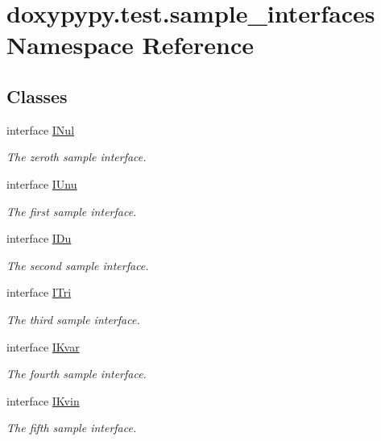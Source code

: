 \hypertarget{namespacedoxypypy_1_1test_1_1sample__interfaces}{\section{doxypypy.\-test.\-sample\-\_\-interfaces Namespace Reference}
\label{namespacedoxypypy_1_1test_1_1sample__interfaces}
}
\subsection*{Classes}
\begin{DoxyCompactItemize}
\item 
interface \hyperlink{classdoxypypy_1_1test_1_1sample__interfaces_1_1_i_nul}{I\-Nul}
\begin{DoxyCompactList}\small\item\em The zeroth sample interface. \end{DoxyCompactList}\item 
interface \hyperlink{classdoxypypy_1_1test_1_1sample__interfaces_1_1_i_unu}{I\-Unu}
\begin{DoxyCompactList}\small\item\em The first sample interface. \end{DoxyCompactList}\item 
interface \hyperlink{classdoxypypy_1_1test_1_1sample__interfaces_1_1_i_du}{I\-Du}
\begin{DoxyCompactList}\small\item\em The second sample interface. \end{DoxyCompactList}\item 
interface \hyperlink{classdoxypypy_1_1test_1_1sample__interfaces_1_1_i_tri}{I\-Tri}
\begin{DoxyCompactList}\small\item\em The third sample interface. \end{DoxyCompactList}\item 
interface \hyperlink{classdoxypypy_1_1test_1_1sample__interfaces_1_1_i_kvar}{I\-Kvar}
\begin{DoxyCompactList}\small\item\em The fourth sample interface. \end{DoxyCompactList}\item 
interface \hyperlink{classdoxypypy_1_1test_1_1sample__interfaces_1_1_i_kvin}{I\-Kvin}
\begin{DoxyCompactList}\small\item\em The fifth sample interface. \end{DoxyCompactList}\end{DoxyCompactItemize}
